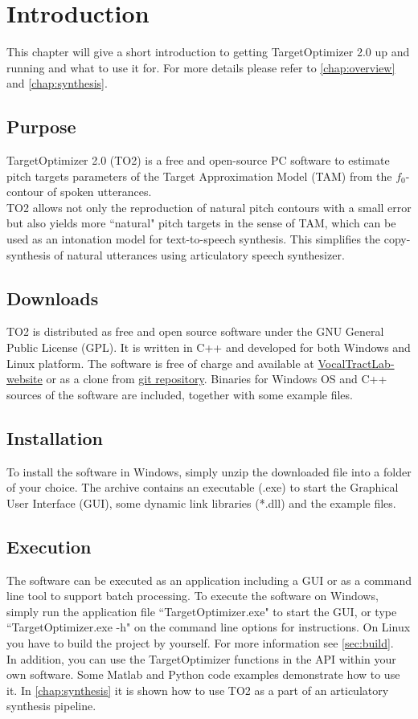 \chapter{Introduction}

This chapter will give a short introduction to getting TargetOptimizer 2.0 up and running and what to use it for. For more details please refer to \autoref{chap:overview} and \autoref{chap:synthesis}.

\section{Purpose}
TargetOptimizer 2.0 (TO2) is a free and open-source PC software to estimate pitch targets parameters of the Target Approximation Model (TAM) from the $f_{0}$-contour of spoken utterances.\\
TO2 allows not only the reproduction of natural pitch contours with a small error but also yields more ``natural" pitch targets in the sense of TAM, which can be used as an intonation model for text-to-speech synthesis. This simplifies the copy-synthesis of natural utterances using articulatory speech synthesizer.

\section{Downloads}
TO2 is distributed as free and open source software under the GNU General Public License (GPL). It is written in C++ and developed for both Windows and Linux platform.
The software is free of charge and available at  \href{https://www.vocaltractlab.de/index.php?page=targetoptimizer-download}{VocalTractLab-website} or as a clone from  \href{https://github.com/TUD-STKS/TargetOptimizer}{git repository}. Binaries for Windows OS and C++ sources of the software are included, together with some example files.

\section{Installation}
To install the software in Windows, simply unzip the downloaded file into a folder of your choice. The archive contains an executable (.exe) to start the Graphical User Interface (GUI), some dynamic link libraries (*.dll) and the example files.


\section{Execution}
The software can be executed as an application including a GUI or as a command line tool to support batch processing. To execute the software on Windows, simply run the application file ``TargetOptimizer.exe" to start the GUI, or type ``TargetOptimizer.exe -h" on the command line options for instructions. On Linux you have to build the project by yourself. For more information see \autoref{sec:build}.\\
In addition, you can use the TargetOptimizer functions in the API within your own software. Some Matlab and Python code examples demonstrate how to use it. In \autoref{chap:synthesis} it is shown how to use TO2 as a part of an articulatory synthesis pipeline.

